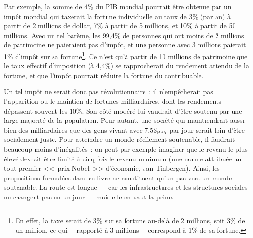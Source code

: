 \documentclass[a5paper,french]{memoir}
\begin{document}
Par exemple, la somme de 4\% du PIB mondial pourrait être obtenue par un impôt mondial qui taxerait la fortune individuelle au taux de 3\% (par an) à partir de 2 millions de dollar, 7\% à partir de 5 millions, et 10\% à partir de 50 millions. %
Avec un tel barème, les 99,4\% de personnes qui ont moins de 2 millions de patrimoine ne paieraient pas d'impôt, et une personne avec 3 millions paierait 1\% d'impôt sur sa fortune\footnote{En effet, la taxe serait de 3\% sur sa fortune au-delà de 2 millions, soit 3\% de un million, ce qui ---rapporté à 3 millions--- correspond à 1\% de sa fortune.}. Ce n'est qu'à partir de 10 millions de patrimoine que le taux effectif d'imposition (à 4,4\%) se rapprocherait du rendement attendu de la fortune, et que l'impôt pourrait réduire la fortune du contribuable. %




Un tel impôt ne serait donc pas révolutionnaire~: il n'empêcherait pas l'apparition ou le maintien de fortunes milliardaires, dont les rendements dépassent souvent les 10\%. %
Son côté modéré lui vaudrait d'être soutenu par une large majorité de la population. Pour autant, une société qui maintiendrait aussi bien des milliardaires que des gens vivant avec 7,5\$$_\text{PPA}$ par jour serait loin d'être socialement juste. Pour atteindre un monde réellement soutenable, il faudrait beaucoup moins d'inégalités~: %
on peut par exemple imaginer que le revenu le plus élevé devrait être limité à cinq fois le revenu minimum (une norme attribuée au tout premier <<~prix Nobel~>> d'économie, Jan Tinbergen). Ainsi, les propositions formulées dans ce livre ne constituent qu'un pas vers un monde soutenable. La route est longue --- car les infrastructures et les structures sociales ne changent pas en un jour --- mais elle en vaut la peine.  
\end{document}
